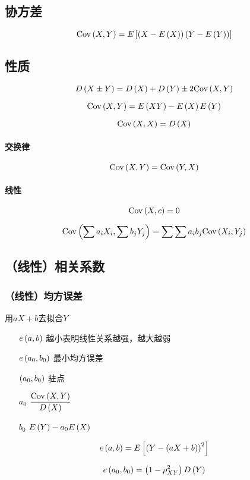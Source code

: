 \documentclass{article}
\begin{document}
\subsection{协方差}

\[\cov XY=E\left[\p{X-E\p{X}}\p{Y-E\p{Y}}\right]\]

\subsection{性质}

\[D\p{X\pm Y}=D\p{X}+D\p{Y}\pm2\cov XY\]

\[\cov XY=E\p{XY}-E\p{X}E\p{Y}\]

\[\cov XX=D\p{X}\]

\paragraph{交换律}

\[\cov XY=\cov YX\]

\paragraph{线性}

\[\cov Xc=0\]

\[\cov{\sum a_iX_i}{\sum b_jY_j}=\sum\sum a_ib_j\cov{X_i}{Y_j}\]

\subsection{（线性）相关系数}

\subsubsection{（线性）均方误差}

用$aX+b$去拟合$Y$

\begin{enumerate}
    \item [$e\p{a,b}$] 越小表明线性关系越强，越大越弱
    \item [$e\p{a_0,b_0}$] 最小均方误差
    \item [$\p{a_0,b_0}$] 驻点
    \item [$a_0$] $\dfrac{\cov XY}{D\p{X}}$
    \item [$b_0$] $E\p{Y}-a_0E\p{X}$
\end{enumerate}

\[e\p{a,b}=E\left[{\p{Y-\p{aX+b}}}^2\right]\]

\[e\p{a_0,b_0}=\p{1-\rho^2_{XY}}D\p{Y}\]
\end{document}
